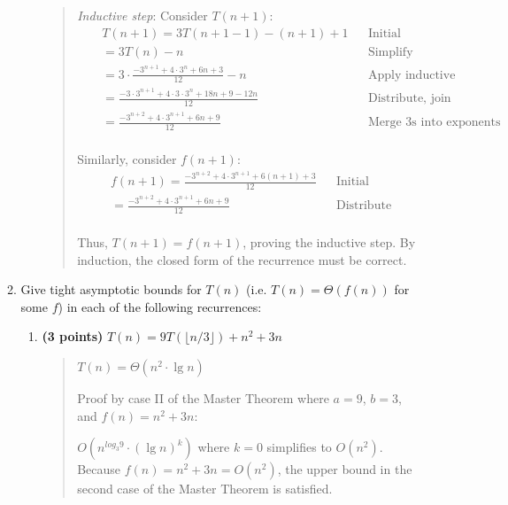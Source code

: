 \documentclass[11pt]{article}
\begin{document}
\begin{enumerate}[leftmargin=*]
\begin{enumerate}
\begin{enumerate}
\begin{quote}
          \medskip 
          \textit{Inductive step}: Consider $T(n + 1)$: 
          \begin{align*}
              && T(n + 1) = 3T(n + 1 - 1) - (n + 1) + 1 && \text{Initial} && \\
              && = 3T(n) - n && \text{Simplify} && \\
              && = 3 \cdot \frac{-3^{n + 1} + 4 \cdot 3^n + 6n + 3}{12} - n && \text{Apply inductive hypothesis} && \\
              && = \frac{-3 \cdot 3^{n + 1} + 4 \cdot 3 \cdot 3^n + 18n + 9 - 12n}{12} && \text{Distribute, join terms} && \\
              && = \frac{-3^{n + 2} + 4 \cdot 3^{n + 1} + 6n + 9}{12} && \text{Merge $3$s into exponents} && \\
          \end{align*} 

          \medskip 
          Similarly, consider $f(n + 1)$:
          \begin{align*}
              && f(n + 1) = \frac{-3^{n + 2} + 4 \cdot 3^{n + 1} + 6(n + 1) + 3}{12} && \text{Initial} && \\
              && = \frac{-3^{n + 2} + 4 \cdot 3^{n + 1} + 6n + 9}{12} && \text{Distribute} && \\
          \end{align*} 

          \medskip
          Thus, $T(n + 1) = f(n + 1)$, proving the inductive step. By induction, the closed form of the recurrence must be correct. 
        \end{quote}
    \end{enumerate}
    \item Give tight asymptotic bounds for $T(n)$ (i.e. $T(n) = \Theta(f(n))$ for some $f$) in each of the following recurrences:
    \begin{enumerate}
        \item
        {\bf (3 points)}
        $T(n) = 9T(\lfloor n/3 \rfloor) + n^2 + 3n$
        \begin{quote}
          \color{purple}
          $T(n) = \Theta(n^2 \cdot \lg n)$

          \medskip
          Proof by case II of the Master Theorem where $a = 9$, $b = 3$, and $f(n) = n^2 + 3n$:

          \medskip
          $O(n^{log_{3}9} \cdot (\lg n)^k)$ where $k = 0$ simplifies to $O(n^2)$. Because $f(n) = n^2 + 3n = O(n^2)$, the upper bound in the second case of the Master Theorem is satisfied.


\end{quote}
\end{enumerate}
\end{enumerate}
\end{enumerate}
\end{document}
